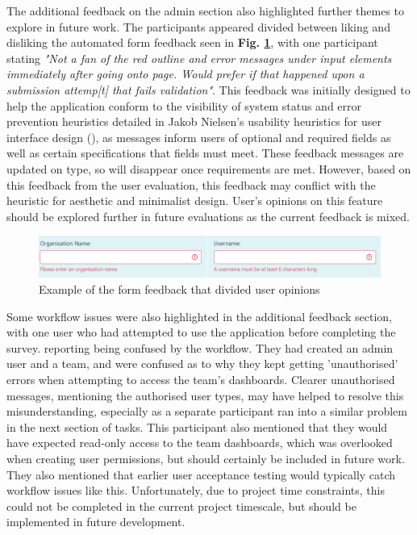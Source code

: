\documentclass[l4proj.tex]{subfiles}
\begin{document}
The additional feedback on the admin section also highlighted further themes to explore in future work. The participants appeared divided between liking and disliking the automated form feedback seen in \textbf{Fig. \ref{fig:admin form feedback}}, with one participant stating \textit{"Not a fan of the red outline and error messages under input elements immediately after going onto page. Would prefer if that happened upon a submission attemp[t] that fails validation"}. This feedback was initially designed to help the application conform to the visibility of system status and error prevention heuristics detailed in Jakob Nielsen's usability heuristics for user interface design (\cite{NeilsenHeuristics}), as messages inform users of optional and required fields as well as certain specifications that fields must meet. These feedback messages are updated on type, so will disappear once requirements are met. However, based on this feedback from the user evaluation, this feedback may conflict with the heuristic for aesthetic and minimalist design. User's opinions on this feature should be explored further in future evaluations as the current feedback is mixed.


\begin{figure}[h!]
\begin{center}
\includegraphics[scale=0.57]{dissertation/images/EvaluationExampleOfFormFeedback.png}
\caption{Example of the form feedback that divided user opinions}
\label{fig:admin form feedback} 
\end{center}
\end{figure}

Some workflow issues were also highlighted in the additional feedback section, with one user who had attempted to use the application before completing the survey. reporting being confused by the workflow. They had created an admin user and a team, and were confused as to why they kept getting 'unauthorised' errors when attempting to access the team's dashboards. Clearer unauthorised messages, mentioning the authorised user types, may have helped to resolve this misunderstanding, especially as a separate participant ran into a similar problem in the next section of tasks. This participant also mentioned that they would have expected read-only access to the team dashboards, which was overlooked when creating user permissions, but should certainly be included in future work. They also mentioned that earlier user acceptance testing would typically catch workflow issues like this. Unfortunately, due to project time constraints, this could not be completed in the current project timescale, but should be implemented in future development.
\end{document}
